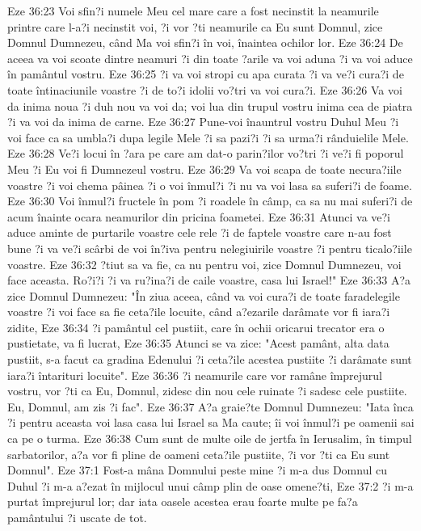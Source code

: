 Eze 36:23  Voi sfin?i numele Meu cel mare care a fost necinstit la neamurile printre care l-a?i necinstit voi, ?i vor ?ti neamurile ca Eu sunt Domnul, zice Domnul Dumnezeu, când Ma voi sfin?i în voi, înaintea ochilor lor.
Eze 36:24  De aceea va voi scoate dintre neamuri ?i din toate ?arile va voi aduna ?i va voi aduce în pamântul vostru.
Eze 36:25  ?i va voi stropi cu apa curata ?i va ve?i cura?i de toate întinaciunile voastre ?i de to?i idolii vo?tri va voi cura?i.
Eze 36:26  Va voi da inima noua ?i duh nou va voi da; voi lua din trupul vostru inima cea de piatra ?i va voi da inima de carne.
Eze 36:27  Pune-voi înauntrul vostru Duhul Meu ?i voi face ca sa umbla?i dupa legile Mele ?i sa pazi?i ?i sa urma?i rânduielile Mele.
Eze 36:28  Ve?i locui în ?ara pe care am dat-o parin?ilor vo?tri ?i ve?i fi poporul Meu ?i Eu voi fi Dumnezeul vostru.
Eze 36:29  Va voi scapa de toate necura?iile voastre ?i voi chema pâinea ?i o voi înmul?i ?i nu va voi lasa sa suferi?i de foame.
Eze 36:30  Voi înmul?i fructele în pom ?i roadele în câmp, ca sa nu mai suferi?i de acum înainte ocara neamurilor din pricina foametei.
Eze 36:31  Atunci va ve?i aduce aminte de purtarile voastre cele rele ?i de faptele voastre care n-au fost bune ?i va ve?i scârbi de voi în?iva pentru nelegiuirile voastre ?i pentru ticalo?iile voastre.
Eze 36:32  ?tiut sa va fie, ca nu pentru voi, zice Domnul Dumnezeu, voi face aceasta. Ro?i?i ?i va ru?ina?i de caile voastre, casa lui Israel!"
Eze 36:33  A?a zice Domnul Dumnezeu: "În ziua aceea, când va voi cura?i de toate faradelegile voastre ?i voi face sa fie ceta?ile locuite, când a?ezarile darâmate vor fi iara?i zidite,
Eze 36:34  ?i pamântul cel pustiit, care în ochii oricarui trecator era o pustietate, va fi lucrat,
Eze 36:35  Atunci se va zice: "Acest pamânt, alta data pustiit, s-a facut ca gradina Edenului ?i ceta?ile acestea pustiite ?i darâmate sunt iara?i întarituri locuite".
Eze 36:36  ?i neamurile care vor ramâne împrejurul vostru, vor ?ti ca Eu, Domnul, zidesc din nou cele ruinate ?i sadesc cele pustiite. Eu, Domnul, am zis ?i fac".
Eze 36:37  A?a graie?te Domnul Dumnezeu: "Iata înca ?i pentru aceasta voi lasa casa lui Israel sa Ma caute; îi voi înmul?i pe oamenii sai ca pe o turma.
Eze 36:38  Cum sunt de multe oile de jertfa în Ierusalim, în timpul sarbatorilor, a?a vor fi pline de oameni ceta?ile pustiite, ?i vor ?ti ca Eu sunt Domnul".
Eze 37:1  Fost-a mâna Domnului peste mine ?i m-a dus Domnul cu Duhul ?i m-a a?ezat în mijlocul unui câmp plin de oase omene?ti,
Eze 37:2  ?i m-a purtat împrejurul lor; dar iata oasele acestea erau foarte multe pe fa?a pamântului ?i uscate de tot.

